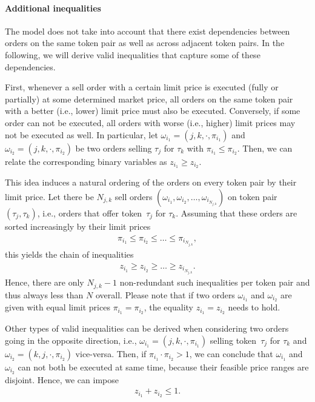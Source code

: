 \documentclass[11pt,parskip=full]{scrartcl}%
\newcommand*{\ie}{i.e., }
\begin{document}
\vspace{-.5cm}
\paragraph{Additional inequalities}

The model does not take into account that there exist dependencies between orders on the same token
pair as well as across adjacent token pairs.
In the following, we will derive valid inequalities that capture some of these dependencies.

First, whenever a sell order with a certain limit price is executed (fully or partially)
at some determined market price, all orders on the same token pair with a better (\ie lower) limit
price must also be executed.
Conversely, if some order can not be executed, all orders with worse (\ie higher) limit prices may
not be executed as well.
In particular, let
$ \omega_{i_1} = (j,k,\cdot,\pi_{i_1}) $ and $ \omega_{i_2} = (j,k,\cdot,\pi_{i_2}) $
be two orders selling $ \tau_j $ for $ \tau_k $ with $ \pi_{i_1} \le \pi_{i_2} $.
Then, we can relate the corresponding binary variables as $ z_{i_1} \ge z_{i_2} $.

This idea induces a natural ordering of the orders on every token pair by their limit price.
Let there be $ N_{j,k} $ sell orders $ (\omega_{i_1}, \omega_{i_2}, \ldots, \omega_{i_{N_{j,k}}}) $
on token pair $ (\tau_j,\tau_k) $, \ie orders that offer token~$ \tau_j $ for $ \tau_k $.
Assuming that these orders are sorted increasingly by their limit prices
\begin{align*}
  \pi_{i_1} \le \pi_{i_2} \le \ldots \le \pi_{i_{N_{j,k}}},
\end{align*}
this yields the chain of inequalities
\begin{align}
  z_{i_1} \ge z_{i_2} \ge \ldots \ge z_{i_{N_{j,k}}}.
  \label{eq:valid_inequality_A}
\end{align}
Hence, there are only $ N_{j,k} - 1 $ non-redundant such inequalities per token pair and thus
always less than $ N $ overall.
Please note that if two orders $ \omega_{i_1} $ and $ \omega_{i_2} $ are given with equal limit
prices $ \pi_{i_1} = \pi_{i_2} $, the equality $ z_{i_1} = z_{i_2} $ needs to hold.

Other types of valid inequalities can be derived when considering two orders going in the
opposite direction, \ie $ \omega_{i_1} = (j,k, \cdot ,\pi_{i_1}) $ selling token~$ \tau_j $ for
$ \tau_k $ and $ \omega_{i_2} = (k,j, \cdot ,\pi_{i_2}) $ vice-versa.
Then, if $ \pi_{i_1} \cdot \pi_{i_2} > 1 $, we can conclude that $ \omega_{i_1} $ and
$ \omega_{i_2} $ can not both be executed at same time, because their feasible price ranges are
disjoint.
Hence, we can impose
\begin{align*}
  z_{i_1} + z_{i_2} \le 1.
\end{align*}
\end{document}
